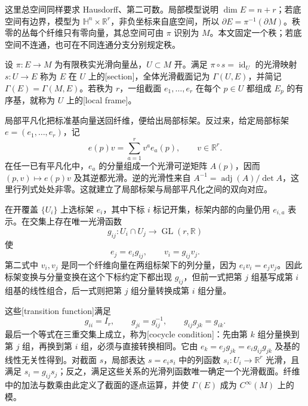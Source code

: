 这里总空间同样要求 Hausdorff、第二可数。局部模型说明 \(\dim E=n+r\)；若底空间有边界，模型为 \(\mathbb H^n\times\mathbb R^r\)，非负坐标来自底空间，所以 \(\partial E=\pi^{-1}(\partial M)\)。秩零的丛每个纤维只有零向量，其总空间可由 \(\pi\) 识别为 \(M\)。本文固定一个秩；若底空间不连通，也可在不同连通分支分别规定秩。

\begin{definition}
	\label{g1:def:bundle-section}
	设 \(\pi:E\to M\) 为有限秩实光滑向量丛，\(U\subset M\) 开。满足 \(\pi\circ s=\operatorname{id}_U\) 的光滑映射 \(s:U\to E\) 称为 \(E\) 在 \(U\) 上的[section]，全体光滑截面记为 \(\Gamma(U,E)\)，并简记 \(\Gamma(E)=\Gamma(M,E)\)。若秩为 \(r\)，一组截面 \(e_1,\ldots,e_r\) 在每个 \(p\in U\) 都组成 \(E_p\) 的有序基，就称为 \(U\) 上的[local frame]。
\end{definition}

局部平凡化把标准基向量送回纤维，便给出局部标架。反过来，给定局部标架 \(e=(e_1,\ldots,e_r)\)，记
\[
	e(p)v=\sum_{a=1}^r v^a e_a(p),\qquad v\in\mathbb R^r.
\]
在任一已有平凡化中，\(e_a\) 的分量组成一个光滑可逆矩阵 \(A(p)\)，因而 \((p,v)\mapsto e(p)v\) 及其逆都光滑。逆的光滑性来自 \(A^{-1}=\operatorname{adj}(A)/\det A\)，这里行列式处处非零。这就建立了局部标架与局部平凡化之间的双向对应。

\ProseParagraphBreak

在开覆盖 \(\{U_i\}\) 上选标架 \(e_i\)，其中下标 \(i\) 标记开集，标架内部的向量仍用 \(e_{i,a}\) 表示。在交集上存在唯一光滑函数
\[
	g_{ij}:U_i\cap U_j\longrightarrow\operatorname{GL}(r,\mathbb R)
\]
使
\begin{equation}
	\label{g1:eq:bundle-frame-transition}
	e_j=e_i g_{ij},\qquad v_i=g_{ij}v_j.
\end{equation}
第二式中 \(v_i,v_j\) 是同一个纤维向量在两组标架下的列分量，因为 \(e_i v_i=e_jv_j\)。因此标架变换与分量变换在这个下标约定下都出现 \(g_{ij}\)，但前一式把第 \(j\) 组基写成第 \(i\) 组基的线性组合，后一式则把第 \(j\) 组分量转换成第 \(i\) 组分量。

\ProseParagraphBreak

这些[transition function]满足
\begin{equation}
	\label{g1:eq:bundle-cocycle}
	g_{ii}=I_r,\qquad g_{ji}=g_{ij}^{-1},\qquad
	g_{ij}g_{jk}=g_{ik}.
\end{equation}
最后一个等式在三重交集上成立，称为[cocycle condition]：先由第 \(k\) 组分量换到第 \(j\) 组，再换到第 \(i\) 组，必须与直接转换相同。它由 \(e_k=e_jg_{jk}=e_i g_{ij}g_{jk}\) 及基的线性无关性得到。对截面 \(s\)，局部表达 \(s=e_i s_i\) 中的列函数 \(s_i:U_i\to\mathbb R^r\) 光滑，且满足 \(s_i=g_{ij}s_j\)；反之，满足这些关系的光滑列函数唯一确定一个光滑截面。纤维中的加法与数乘由此定义了截面的逐点运算，并使 \(\Gamma(E)\) 成为 \(C^\infty(M)\) 上的模。

